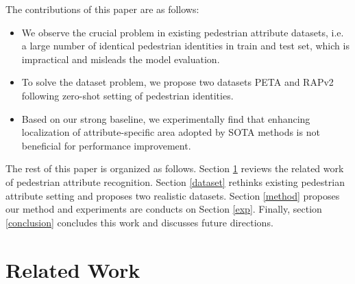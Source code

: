 \documentclass[runningheads]{llncs}
\begin{document}
The contributions of this paper are as follows:
 
\begin{itemize}
	\item We observe the crucial problem in existing pedestrian attribute datasets, i.e. a large number of identical pedestrian identities in train and test set, which is impractical and misleads the model evaluation.
	\item To solve the dataset problem, we propose two datasets PETA\textsubscript{} and RAPv2\textsubscript{} following zero-shot setting of pedestrian identities.
	\item Based on our strong baseline, we experimentally find that  enhancing localization of attribute-specific area adopted by SOTA methods is not beneficial for performance improvement. 
\end{itemize}

The rest of this paper is organized as follows. Section \ref{related_work} reviews the related work of pedestrian attribute recognition. Section \ref{dataset} rethinks existing pedestrian attribute setting and proposes two realistic datasets. Section \ref{method} proposes our method  and experiments are conducts on Section \ref{exp}. Finally, section \ref{conclusion} concludes this work and discusses future directions. 

\section{Related Work} \label{related_work}
\end{document}
